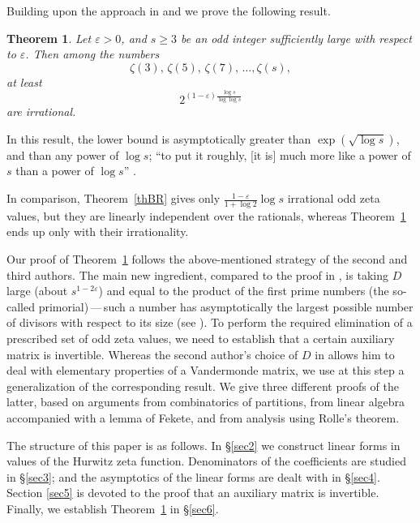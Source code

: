 \documentclass{article}
\numberwithin{equation}{section}
\newtheorem{Th}{Theorem}
\theoremstyle{remark}
\newcommand{\eps}{\varepsilon}
\begin{document}
\bigskip

Building upon the approach in \cite{Zudilintrick} and \cite{Sprang} we prove the following result.
 
\begin{Th} \label{th1}
Let $\eps > 0$, and $s\geq 3$ be an odd integer sufficiently large with respect to $\eps$. Then among the numbers
$$\zeta(3), \, \zeta(5), \, \zeta(7), \, \ldots , \zeta(s),$$
at least
$$2^{(1-\eps)\frac{\log s}{\log \log s}}$$
are irrational.
\end{Th}

In this result, the lower bound is asymptotically greater than $\exp(\sqrt{\log s})$, and than any power of $\log s$; ``to put it roughly, [it is] much more like a power of $s$ than a power of $\log s$'' \cite[Chapter XVIII, \S 1]{HW}.

In comparison, Theorem~\ref{thBR} gives only $\frac{1-\eps}{1+ \log 2} \log s$ irrational odd zeta values, but they are linearly independent
over the rationals, whereas Theorem~\ref{th1} ends up only with their irrationality.

\bigskip

Our proof of Theorem~\ref{th1} follows the above-mentioned strategy of the second and third authors. The main new ingredient, compared to the proof in \cite{Sprang}, is taking $D$ large (about $s^{1-2\eps}$) and equal to the product of the first prime numbers (the so-called primorial)\,---\,such a number has asymptotically the largest possible number of divisors with respect to its size (see \cite[Chapter XVIII, \S 1]{HW}). To perform the required elimination of a prescribed set of odd zeta values, we need to establish
that a certain auxiliary matrix is invertible. Whereas the second author's choice of $D$ in \cite{Sprang} allows him to deal with elementary properties of a Vandermonde matrix, we use at this step a generalization of the corresponding result.
We give three different proofs of the latter, based on arguments from combinatorics of partitions, from linear algebra accompanied with a lemma of Fekete, and from analysis using Rolle's theorem.

\bigskip

The structure of this paper is as follows. In \S \ref{sec2} we construct linear forms in values of the Hurwitz zeta function. Denominators of the coefficients are studied in \S \ref{sec3}; and the asymptotics of the linear forms are dealt with in \S \ref{sec4}. Section \ref{sec5} is devoted to the proof that an auxiliary matrix is invertible. Finally, we establish Theorem~\ref{th1} in \S \ref{sec6}.
\end{document}
